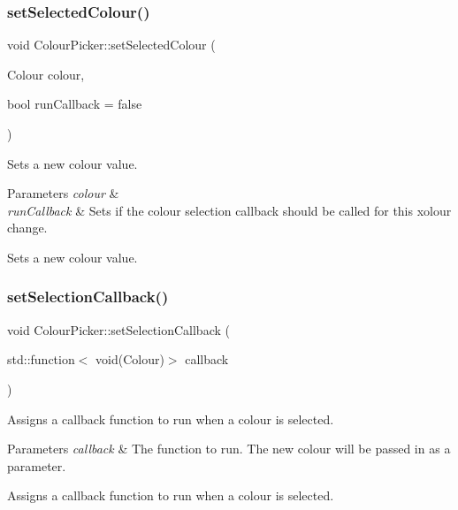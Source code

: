\subsubsection{\texorpdfstring{set\+Selected\+Colour()}{setSelectedColour()}}
{\footnotesize\ttfamily void Colour\+Picker\+::set\+Selected\+Colour (\begin{DoxyParamCaption}\item[{Colour}]{colour,  }\item[{bool}]{run\+Callback = {\ttfamily false} }\end{DoxyParamCaption})}

Sets a new colour value.


\begin{DoxyParams}{Parameters}
{\em colour} & \\
\hline
{\em run\+Callback} & Sets if the colour selection callback should be called for this xolour change.\\
\hline
\end{DoxyParams}
Sets a new colour value. \mbox{\label{classColourPicker_a8746628b7337bfe94aa0c1e426a48884}} 
\subsubsection{\texorpdfstring{set\+Selection\+Callback()}{setSelectionCallback()}}
{\footnotesize\ttfamily void Colour\+Picker\+::set\+Selection\+Callback (\begin{DoxyParamCaption}\item[{std\+::function$<$ void(Colour)$>$}]{callback }\end{DoxyParamCaption})}

Assigns a callback function to run when a colour is selected.


\begin{DoxyParams}{Parameters}
{\em callback} & The function to run. The new colour will be passed in as a parameter.\\
\hline
\end{DoxyParams}
Assigns a callback function to run when a colour is selected. \mbox{\label{classColourPicker_ab5ff0a207d39bf95dbfa7f99b1ceb195}} 
